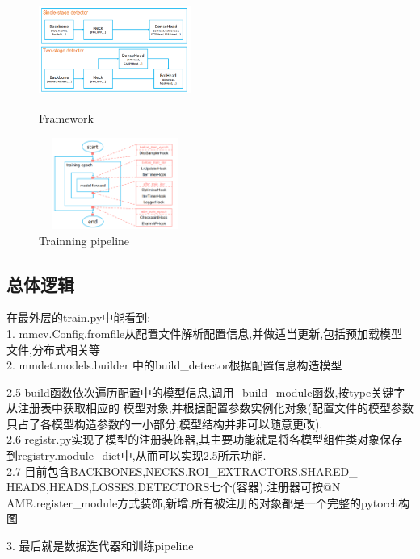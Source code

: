 \documentclass[UTF8]{ctexart}
\begin{document}
\begin{figure}[htbp]
	\centering
	\begin{minipage}[t]{0.48\textwidth}
	\centering
	\includegraphics[width=5cm, height=3cm]{./pic/mmdetect.png}
	\caption{ Framework }
	\end{minipage}
	\begin{minipage}[t]{0.48\textwidth}
	\centering
	\includegraphics[width=5cm,height=3cm]{./pic/mmdetect_pipe.png}
	\caption{Trainning pipeline}
	\end{minipage}
\end{figure}

\subsection{总体逻辑}
在最外层的train.py中能看到:\\
1. mmcv.Config.fromfile从配置文件解析配置信息,并做适当更新,包括预加载模型文件,分布式相关等\\
2. mmdet.models.builder 中的build\_detector根据配置信息构造模型

\begin{adjustwidth}{0.5cm}{0cm}
2.5 build函数依次遍历配置中的模型信息,调用\_build\_module函数,按type关键字从注册表中获取相应的
模型对象,并根据配置参数实例化对象(配置文件的模型参数只占了各模型构造参数的一小部分,模型结构并非可以随意更改).\\
2.6 registr.py实现了模型的注册装饰器,其主要功能就是将各模型组件类对象保存到registry.module\_dict中,从而可以实现2.5所示功能.\\
2.7 目前包含BACKBONES,NECKS,ROI\_EXTRACTORS,SHARED\_\\
HEADS,HEADS,LOSSES,DETECTORS七个(容器).注册器可按@N
AME.register\_module方式装饰,新增.所有被注册的对象都是一个完整的pytorch构图\
\end{adjustwidth}
3. 最后就是数据迭代器和训练pipeline
\end{document}
